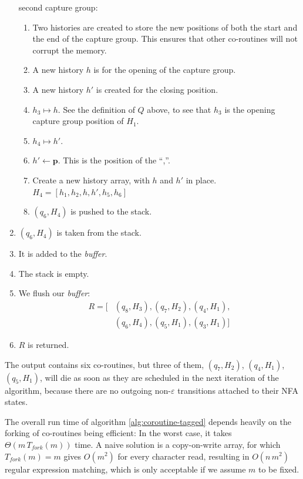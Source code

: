 \documentclass[11pt,a4paper,twoside,openright]{Thesis}
\theoremstyle{definition}
\newcommand{\pos}{\mathbf{\mathbf{p}}}
\begin{document}
\begin{example}
\begin{enumerate}
  second capture group:\begin{enumerate}
  \item Two histories are created to store the new positions of both the start
    and the end of the capture group. This ensures that other co-routines will
    not corrupt the memory.
	\item A new history $h$ is for the opening of the capture group.
	\item A new history $h'$ is created for the closing position.
  \item $h_3 \mapsto h$. See the definition of $Q$ above, to see that $h_3$ is
    the opening capture group position of $H_1$.
	\item $h_4 \mapsto h'$.
	\item $h'\leftarrow\pos$. This is the position of the ``,''.
	\item Create a new history array, with $h$ and $h'$ in place.
		$H_4 = [h_1, h_2, h, h', h_5, h_6]$
	\item $(q_6, H_4)$ is pushed to the stack.
\end{enumerate}
\item $(q_6, H_4)$ is taken from the stack.
\item It is added to the \emph{buffer}.
\item The stack is empty.
\item We flush our \emph{buffer}:
\begin{align*}
R=[&(q_8, H_3), (q_7, H_2), (q_4, H_1),\\ &(q_6, H_4), (q_5, H_1), (q_3, H_1)]
\end{align*}
\item $R$ is returned.
\end{enumerate}
\end{example}

The output contains six co-routines, but three of them,  $(q_7, H_2)$,
$(q_4, H_1)$,  $(q_5, H_1)$, will die as soon as they are scheduled in
the next iteration of the algorithm, because there are no outgoing
non-$\varepsilon$ transitions attached to their NFA states.

The overall run time of algorithm \ref{alg:coroutine-tagged} depends heavily on the
forking of co-routines being efficient: In the worst case, it takes
$\Theta(m\, T_{fork}(m))$ time. A naive solution is a copy-on-write array, for
which $T_{fork}(m)=m$ gives $O(m^2)$ for every character read, resulting
in $O(n\,m^2)$ regular expression matching, which is only acceptable
if we assume $m$ to be fixed.
\end{document}
